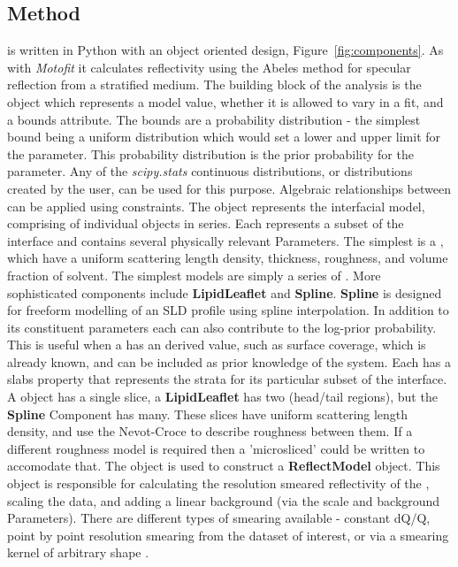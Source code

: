\documentclass[12pt]{article}
\begin{document}
\subsection*{Method}
 is written in Python with an object oriented design, Figure~\ref{fig:components}. As with \emph{Motofit} \cite{Nelson2006} it calculates reflectivity using the Abeles method \cite{Heavens1955} for specular reflection from a stratified medium.
The building block of the analysis is the \Parameter object which represents a model value, whether it is allowed to vary in a fit, and a bounds attribute. The bounds are a probability distribution - the simplest bound being a uniform distribution which would set a lower and upper limit for the parameter. This probability distribution is the prior probability for the parameter. Any of the \emph{scipy.stats} \cite{Jones2001-2017} continuous distributions, or distributions created by the user, can be used for this purpose. Algebraic relationships between \Parameter can be applied using constraints.
The \Structure object represents the interfacial model, comprising of individual \Component objects in series. Each \Component represents a subset of the interface and contains several physically relevant Parameters. The simplest \Component is a \Slab, which have a uniform scattering length density, thickness, roughness, and volume fraction of solvent. The simplest models are simply a series of \Slab. More sophisticated components include \textbf{LipidLeaflet} and \textbf{Spline}. \textbf{Spline} is designed for freeform modelling of an SLD profile using spline interpolation. In addition to its constituent parameters each \Component can also contribute to the log-prior probability. This is useful when a \Component has an derived value, such as surface coverage, which is already known, and can be included as prior knowledge of the system. Each \Component has a slabs property that represents the strata for its particular subset of the interface. A \Slab object has a single slice, a \textbf{LipidLeaflet} has two (head/tail regions), but the \textbf{Spline} Component has many. These slices have uniform scattering length density, and use the Nevot-Croce \cite{Nevot1980} to describe roughness between them. If a different roughness model is required then a 'microsliced' \Component could be written to accomodate that.
The \Structure object is used to construct a \textbf{ReflectModel} object. This object is responsible for calculating the resolution smeared reflectivity of the \Structure, scaling the data, and adding a linear background (via the scale and background Parameters). There are different types of smearing available - constant dQ/Q, point by point resolution smearing from the dataset of interest, or via a smearing kernel of arbitrary shape \cite{Nelson2014}.
\end{document}
